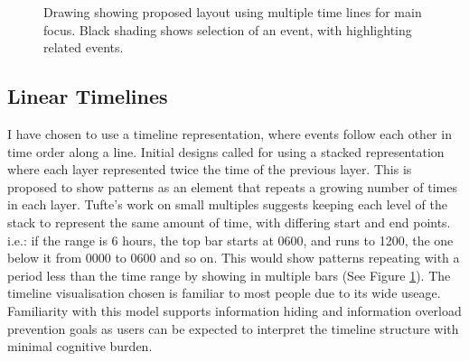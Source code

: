 \begin{figure}[tbh]
\caption{\protect\label{lines}Drawing showing proposed layout using multiple time lines for main focus. Black shading shows selection of an event, with highlighting related events.}
\end{figure}

\subsection{Linear Timelines}\label{des_timelines}

I have chosen to use a timeline representation, where events follow each other in time order along a line.
Initial designs called for using a stacked representation where each layer represented twice the time of the previous layer. This is proposed to show patterns as an element that repeats a growing number of times in each layer.
Tufte's work on small multiples \cite{tufte1983visual} suggests keeping each level of the stack to represent the same amount of time, with differing start and end points. i.e.: if the range is 6 hours, the top bar starts at 0600, and runs to 1200, the one below it from 0000 to 0600 and so on. This would show patterns repeating with a period less than the time range by showing in multiple bars (See Figure \ref{lines}). The timeline visualisation chosen is familiar to most people due to its wide useage. Familiarity with this model supports information hiding and information overload prevention goals as users can be expected to interpret the timeline structure with minimal cognitive burden. 


